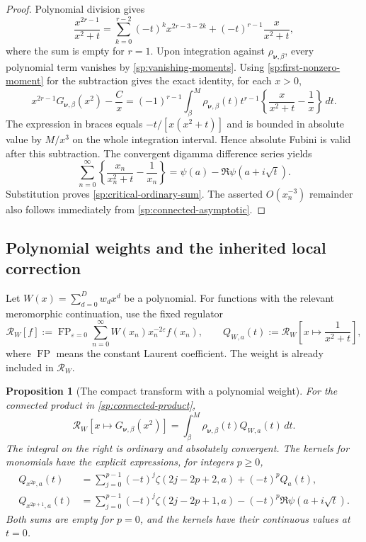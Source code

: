 \documentclass[11pt,letterpaper]{article}
\numberwithin{equation}{section}
\newtheorem{proposition}[theorem]{Proposition}
\theoremstyle{definition}
\theoremstyle{remark}
\begin{document}
\begin{proof}
Polynomial division gives
\[
 \frac{x^{2r-1}}{x^2+t}
 =\sum_{k=0}^{r-2}(-t)^k x^{2r-3-2k}
          +(-t)^{r-1}\frac{x}{x^2+t},
\]
where the sum is empty for $r=1$.
Upon integration against $\rho_{\boldsymbol\nu,\beta}$, every
polynomial term vanishes by \eqref{sp:vanishing-moments}.
Using \eqref{sp:first-nonzero-moment} for the subtraction gives
the exact identity, for each $x>0$,
\[
 x^{2r-1}G_{\boldsymbol\nu,\beta}(x^2)-\frac{C}{x}
 =(-1)^{r-1}\int_\beta^M
       \rho_{\boldsymbol\nu,\beta}(t)t^{r-1}
             \left\{\frac{x}{x^2+t}-\frac1x\right\}\,dt.
\]
The expression in braces equals $-t/[x(x^2+t)]$ and is bounded
in absolute value by $M/x^3$ on the whole integration interval.
Hence absolute Fubini is valid after this subtraction.
The convergent digamma difference series yields
\[
 \sum_{n=0}^{\infty}
       \left\{\frac{x_n}{x_n^2+t}-\frac1{x_n}\right\}
       =\psi(a)-\Re\psi(a+i\sqrt t).
\]
Substitution proves \eqref{sp:critical-ordinary-sum}.
The asserted $O(x_n^{-3})$ remainder also follows immediately
from \eqref{sp:connected-asymptotic}.
\end{proof}

\subsection{Polynomial weights and the inherited local correction}
\label{sp:weighted-bridge}

Let $W(x)=\sum_{d=0}^{D}w_dx^d$ be a polynomial.  For functions
with the relevant meromorphic continuation, use the fixed
regulator
\begin{equation}
 \mathcal R_W[f]
 :=\operatorname{FP}_{\varepsilon=0}
     \sum_{n=0}^{\infty}W(x_n)x_n^{-2\varepsilon}f(x_n),
 \qquad
 Q_{W,a}(t):=\mathcal R_W\left[x\longmapsto\frac{1}{x^2+t}\right],
 \label{sp:fixed-regulator}
\end{equation}
where $\operatorname{FP}$ means the constant Laurent coefficient.
The weight is already included in $\mathcal R_W$.

\begin{proposition}[The compact transform with a polynomial weight]
\label{sp:weighted-compact}
For the connected product in \eqref{sp:connected-product},
\begin{equation}
 \mathcal R_W[x\longmapsto G_{\boldsymbol\nu,\beta}(x^2)]
 =\int_\beta^M\rho_{\boldsymbol\nu,\beta}(t)Q_{W,a}(t)\,dt.
 \label{sp:weighted-compact-transform}
\end{equation}
The integral on the right is ordinary and absolutely convergent.
The kernels for monomials have the explicit expressions, for
integers $p\geq0$,
\begin{align}
 Q_{x^{2p},a}(t)
 &=\sum_{j=0}^{p-1}(-t)^j\zeta(2j-2p+2,a)
                        +(-t)^pQ_a(t),
 \label{sp:even-weight-kernel}\\
 Q_{x^{2p+1},a}(t)
 &=\sum_{j=0}^{p-1}(-t)^j\zeta(2j-2p+1,a)
                        -(-t)^p\Re\psi(a+i\sqrt t).
 \label{sp:odd-weight-kernel}
\end{align}
Both sums are empty for $p=0$, and the kernels have their
continuous values at $t=0$.
\end{proposition}
\end{document}
